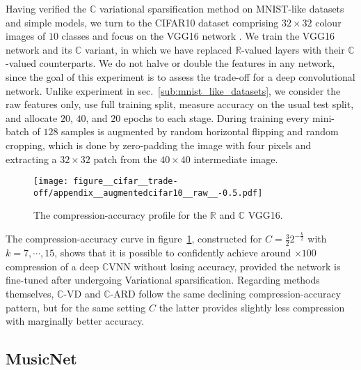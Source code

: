 \documentclass{article}
\newcommand{\real}{\mathbb{R}}
\newcommand{\cplx}{\mathbb{C}}
\begin{document}
Having verified the $\cplx$ variational sparsification method on MNIST-like datasets
and simple models, we turn to the CIFAR10 dataset comprising $32\times 32$ colour
images of $10$ classes \citep{krizhevsky_learning_2009} and focus on the VGG16 network
\citep{simonyan_very_2015}.
%
We train the VGG16 network and its $\cplx$ variant, in which we have replaced $\real$-valued
layers with their $\cplx$-valued counterparts. We do not halve or double the features
in any network, since the goal of this experiment is to assess the trade-off for a deep
convolutional network.
%
Unlike experiment in sec.~\ref{sub:mnist_like_datasets}, we consider the raw features
only, use full training split, measure accuracy on the usual test split, and allocate
$20$, $40$, and $20$ epochs to each stage.
During training every mini-batch of $128$ samples is augmented by random horizontal flipping
and random cropping, which is done by zero-padding the image with four pixels and extracting
a $32\times 32$ patch from the $40\times 40$ intermediate image.

\begin{figure}[!t]
  \centering
  \texttt{[image: figure\_\_cifar\_\_trade-off/appendix\_\_augmentedcifar10\_\_raw\_\_-0.5.pdf]}
  \caption{%
    The compression-accuracy profile for the $\real$ and $\cplx$ VGG16.
  }
  \label{fig:figure__cifar10__trade-off}
\end{figure}

The compression-accuracy curve in figure~\ref{fig:figure__cifar10__trade-off}, constructed
for $C = \tfrac32 2^{-\tfrac{k}2}$ with $k=7, \cdots, 15$, shows that
it is possible to confidently achieve around $\times100$ compression of a deep $\cplx$VNN
without losing accuracy, provided the network is fine-tuned after undergoing Variational
sparsification. Regarding methods themselves, $\cplx$-VD and $\cplx$-ARD follow the same
declining compression-accuracy pattern, but for the same setting $C$ the latter provides
slightly less compression with marginally better accuracy.



\subsection{MusicNet} %
\label{sub:musicnet}
\end{document}
